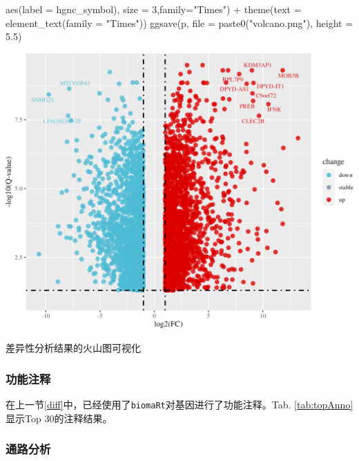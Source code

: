 \documentclass[
]{article}
\newenvironment{Shaded}{\begin{snugshade}}{\end{snugshade}}
\newcommand{\AttributeTok}[1]{\textcolor[rgb]{0.77,0.63,0.00}{#1}}
\newcommand{\DecValTok}[1]{\textcolor[rgb]{0.00,0.00,0.81}{#1}}
\newcommand{\FloatTok}[1]{\textcolor[rgb]{0.00,0.00,0.81}{#1}}
\newcommand{\FunctionTok}[1]{\textcolor[rgb]{0.00,0.00,0.00}{#1}}
\newcommand{\NormalTok}[1]{#1}
\newcommand{\SpecialCharTok}[1]{\textcolor[rgb]{0.00,0.00,0.00}{#1}}
\newcommand{\StringTok}[1]{\textcolor[rgb]{0.31,0.60,0.02}{#1}}
\begin{document}
\begin{Shaded}
\begin{Highlighting}[]
            \FunctionTok{aes}\NormalTok{(}\AttributeTok{label =}\NormalTok{ hgnc\_symbol),}
            \AttributeTok{size =} \DecValTok{3}\NormalTok{,}\AttributeTok{family=}\StringTok{"Times"}\NormalTok{) }\SpecialCharTok{+}
        \FunctionTok{theme}\NormalTok{(}\AttributeTok{text =} \FunctionTok{element\_text}\NormalTok{(}\AttributeTok{family =} \StringTok{"Times"}\NormalTok{))}
\FunctionTok{ggsave}\NormalTok{(p, }\AttributeTok{file =} \FunctionTok{paste0}\NormalTok{(}\StringTok{"volcano.png"}\NormalTok{), }\AttributeTok{height =} \FloatTok{5.5}\NormalTok{)}
\end{Highlighting}
\end{Shaded}

\bgroup {}
\includegraphics[width=28.22in]{thesis_fig/volcano} \caption{差异性分析结果的火山图可视化}\label{fig:vol}
\makeatletter \egroup

\hypertarget{ux529fux80fdux6ce8ux91ca}{%
\subsubsection{功能注释}\label{ux529fux80fdux6ce8ux91ca}}

在上一节\ref{diff}中，已经使用了\texttt{biomaRt}对基因进行了功能注释。Tab. \ref{tab:topAnno}显示Top 30的注释结果。

\hypertarget{ux901aux8defux5206ux6790}{%
\subsubsection{通路分析}\label{ux901aux8defux5206ux6790}}
\end{document}
